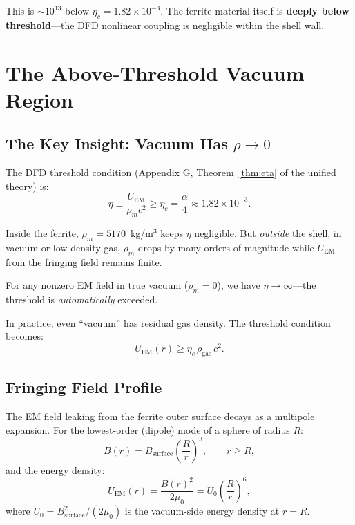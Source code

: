 \documentclass[amsmath,amssymb,aps,prd,superscriptaddress,nofootinbib]{revtex4-2}
\begin{document}
This is $\sim 10^{13}$ below $\eta_c = 1.82 \times 10^{-3}$. The ferrite
material itself is \textbf{deeply below threshold}---the DFD nonlinear
coupling is negligible within the shell wall.

\section{The Above-Threshold Vacuum Region}\label{sec:threshold}

\subsection{The Key Insight: Vacuum Has $\rho \to 0$}

The DFD threshold condition (Appendix G, Theorem~\ref*{thm:eta} of the
unified theory) is:
\begin{equation}\label{eq:threshold}
\eta \equiv \frac{U_\text{EM}}{\rho_m c^2} \geq \eta_c = \frac{\alpha}{4}
\approx 1.82 \times 10^{-3}.
\end{equation}

Inside the ferrite, $\rho_m = 5170$~kg/m$^3$ keeps $\eta$ negligible.
But \emph{outside} the shell, in vacuum or low-density gas, $\rho_m$ drops
by many orders of magnitude while $U_\text{EM}$ from the fringing field
remains finite.

For any nonzero EM field in true vacuum ($\rho_m = 0$), we have
$\eta \to \infty$---the threshold is \emph{automatically} exceeded.

In practice, even ``vacuum'' has residual gas density. The threshold
condition becomes:
\begin{equation}
U_\text{EM}(r) \geq \eta_c \, \rho_\text{gas} \, c^2.
\end{equation}

\subsection{Fringing Field Profile}

The EM field leaking from the ferrite outer surface decays as a multipole
expansion. For the lowest-order (dipole) mode of a sphere of radius $R$:
\begin{equation}\label{eq:B-profile}
B(r) = B_\text{surface} \left(\frac{R}{r}\right)^3, \qquad r \geq R,
\end{equation}
and the energy density:
\begin{equation}\label{eq:UEM-profile}
U_\text{EM}(r) = \frac{B(r)^2}{2\mu_0} = U_0 \left(\frac{R}{r}\right)^6,
\end{equation}
where $U_0 = B_\text{surface}^2/(2\mu_0)$ is the vacuum-side energy
density at $r = R$.
\end{document}
